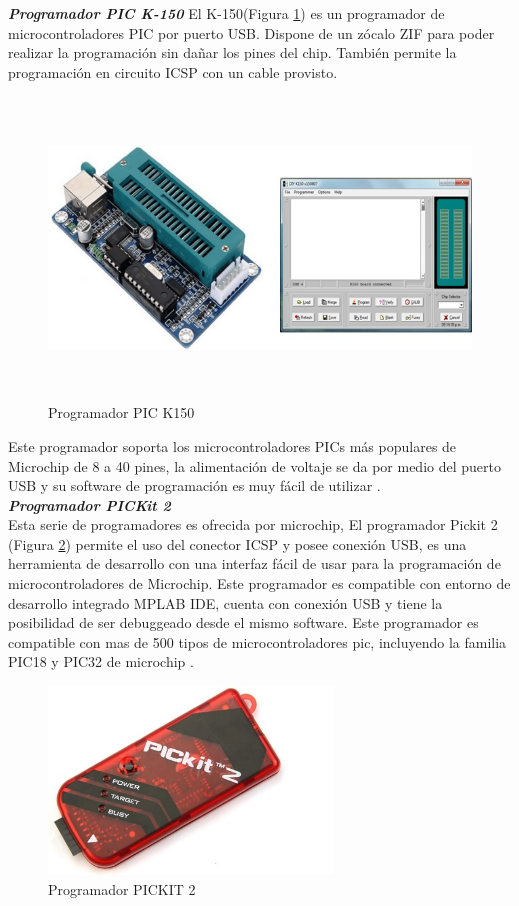 \documentclass[12pt,a4paper]{article}
\begin{document}
   \textbf{\textit{Programador PIC K-150}}
   El K-150(Figura \ref{fig:K150}) es un programador de microcontroladores PIC por puerto USB. Dispone de un zócalo ZIF para poder realizar la programación sin dañar los pines del chip. También permite la programación en circuito ICSP con un cable provisto.
   
    \begin{figure}[htpb]
    \centering
    \includegraphics[height=8cm]{K150}
    \caption{Programador PIC K150}
    \label{fig:K150}
    \end{figure}
   
   Este programador soporta los microcontroladores PICs más populares de Microchip de 8 a 40 pines, la alimentación de voltaje se da por medio del puerto USB y su software de programación es muy fácil de utilizar \cite{K150}. \\
   
   \textbf{\textit{Programador PICKit 2}}\\
   Esta serie de programadores es ofrecida por microchip, El programador Pickit 2 (Figura \ref{fig:PICKIT2}) permite el uso del conector ICSP y posee conexión USB, es una herramienta de desarrollo con una interfaz fácil de usar para la programación de microcontroladores de Microchip.  Este programador es compatible con entorno de desarrollo integrado MPLAB IDE, cuenta con conexión USB y tiene la posibilidad de ser debuggeado desde el mismo software. Este programador es compatible con mas de 500 tipos de microcontroladores pic, incluyendo la familia PIC18 y PIC32 de microchip \cite{PIC}.
   
   
   \begin{figure}[htpb]
   \centering
   \includegraphics[height=5cm]{PICKIT2}
   \caption{Programador PICKIT 2}
   \label{fig:PICKIT2}
   \end{figure}
   
\end{document}
